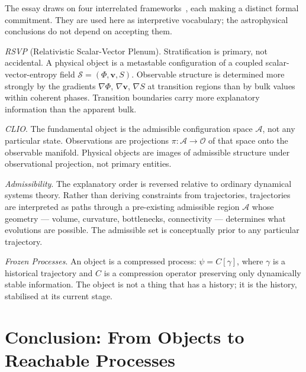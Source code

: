 \documentclass[12pt, oneside]{article}
\begin{document}
\begin{mdframed}[linewidth=0.4pt, innerleftmargin=10pt, innerrightmargin=10pt,
                  innertopmargin=8pt, innerbottommargin=8pt]
\noindent The essay draws on four interrelated frameworks~\cite{flyxion_frameworks}, each making a distinct formal commitment. They are used here as interpretive vocabulary; the astrophysical conclusions do not depend on accepting them.

\smallskip
\noindent\textit{RSVP} (Relativistic Scalar-Vector Plenum). Stratification is primary, not accidental. A physical object is a metastable configuration of a coupled scalar-vector-entropy field $\mathcal{S} = (\Phi, \mathbf{v}, S)$. Observable structure is determined more strongly by the gradients $\nabla\Phi$, $\nabla\mathbf{v}$, $\nabla S$ at transition regions than by bulk values within coherent phases. Transition boundaries carry more explanatory information than the apparent bulk.

\smallskip
\noindent\textit{CLIO}. The fundamental object is the admissible configuration space $\mathcal{A}$, not any particular state. Observations are projections $\pi : \mathcal{A} \to \mathcal{O}$ of that space onto the observable manifold. Physical objects are images of admissible structure under observational projection, not primary entities.

\smallskip
\noindent\textit{Admissibility}. The explanatory order is reversed relative to ordinary dynamical systems theory. Rather than deriving constraints from trajectories, trajectories are interpreted as paths through a pre-existing admissible region $\mathcal{A}$ whose geometry --- volume, curvature, bottlenecks, connectivity --- determines what evolutions are possible. The admissible set is conceptually prior to any particular trajectory.

\smallskip
\noindent\textit{Frozen Processes}. An object is a compressed process: $\psi = C[\gamma]$, where $\gamma$ is a historical trajectory and $C$ is a compression operator preserving only dynamically stable information. The object is not a thing that has a history; it is the history, stabilised at its current stage.
\end{mdframed}

\section{Conclusion: From Objects to Reachable Processes}
\end{document}
